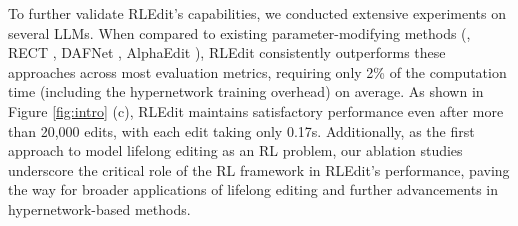 To further validate RLEdit's capabilities, we conducted extensive experiments on several LLMs. When compared to existing parameter-modifying methods (\eg, RECT \cite{rect}, DAFNet \cite{dafnet}, AlphaEdit \cite{alphaedit}), RLEdit consistently outperforms these approaches across most evaluation metrics, requiring only 2\% of the computation time (including the hypernetwork training overhead) on average. As shown in Figure \ref{fig:intro} (c), RLEdit maintains satisfactory performance even after more than 20,000 edits, with each edit taking only 0.17s. Additionally, as the first approach to model lifelong editing as an RL problem, our ablation studies underscore the critical role of the RL framework in RLEdit's performance, paving the way for broader applications of lifelong editing and further advancements in hypernetwork-based methods.